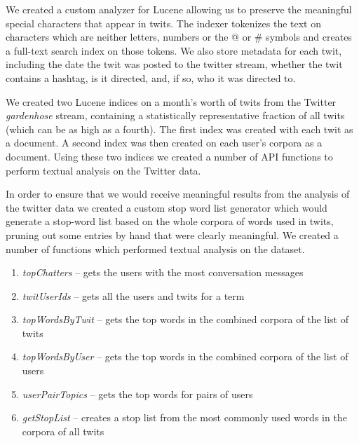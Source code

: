 \documentclass[10pt,oneside]{memoir}
\begin{document}
\begin{Spacing}{2}
We created a custom analyzer for Lucene allowing us to preserve the
meaningful special characters that appear in twits. The indexer
tokenizes the text on characters which are neither letters, numbers
or the @ or \# symbols and creates a full-text search index on
those tokens. We also store metadata for each twit, including the
date the twit was posted to the twitter stream, whether the twit
contains a hashtag, is it directed, and, if so, who it was directed
to.


We created two Lucene indices on a month's worth of twits from the
Twitter {\itshape gardenhose} stream, containing a statistically
representative fraction of all twits (which can be as high as a
fourth). The first index was created with each twit as a document.
A second index was then created on each user's corpora as a
document. Using these two indices we created a number of API
functions to perform textual analysis on the Twitter data.


In order to ensure that we would receive meaningful results from
the analysis of the twitter data we created a custom stop word list
generator which would generate a stop-word list based on the whole
corpora of words used in twits, pruning out some entries by hand
that were clearly meaningful. We created a number of functions
which performed textual analysis on the dataset.


\begin{enumerate}


\item {\itshape topChatters} -- gets the users with the most conversation
messages




\item {\itshape twitUserIds} -- gets all the users and twits for a term




\item {\itshape topWordsByTwit} -- gets the top words in the combined corpora
of the list of twits




\item {\itshape topWordsByUser} -- gets the top words in the combined corpora
of the list of users




\item {\itshape userPairTopics} -- gets the top words for pairs of users




\item {\itshape getStopList} -- creates a stop list from the most commonly used
words in the corpora of all twits




\end{enumerate}
\end{Spacing}
\end{document}
